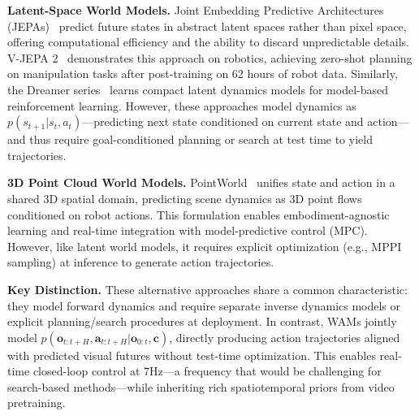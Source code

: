 \documentclass[10pt,logo,copyright]{nvidiatechreport}
\begin{document}
\textbf{Latent-Space World Models.} Joint Embedding Predictive Architectures (JEPAs)~\citep{lecun2022path, assran2023self, bardes2024vjepa, assran2025vjepa2} predict future states in abstract latent spaces rather than pixel space, offering computational efficiency and the ability to discard unpredictable details. V-JEPA 2~\citep{assran2025vjepa2} demonstrates this approach on robotics, achieving zero-shot planning on manipulation tasks after post-training on 62 hours of robot data. Similarly, the Dreamer series~\citep{hafner2019dream, hafner2020mastering, hafner2023mastering, hafner2025trainingagentsinsidescalable} learns compact latent dynamics models for model-based reinforcement learning. However, these approaches model dynamics as $p(s_{t+1} | s_t, a_t)$—predicting next state conditioned on current state and action—and thus require goal-conditioned planning or search at test time to yield trajectories.

\textbf{3D Point Cloud World Models.} PointWorld~\citep{huang2025pointworld} unifies state and action in a shared 3D spatial domain, predicting scene dynamics as 3D point flows conditioned on robot actions. This formulation enables embodiment-agnostic learning and real-time integration with model-predictive control (MPC). However, like latent world models, it requires explicit optimization (e.g., MPPI sampling) at inference to generate action trajectories.

\textbf{Key Distinction.} These alternative approaches share a common characteristic: they model forward dynamics and require separate inverse dynamics models or explicit planning/search procedures at deployment. In contrast, WAMs jointly model $p(\mathbf{o}_{t:t+H}, \mathbf{a}_{t:t+H} | \mathbf{o}_{0:t}, \mathbf{c})$, directly producing action trajectories aligned with predicted visual futures without test-time optimization. This enables real-time closed-loop control at 7Hz—a frequency that would be challenging for search-based methods—while inheriting rich spatiotemporal priors from video pretraining.
\end{document}
